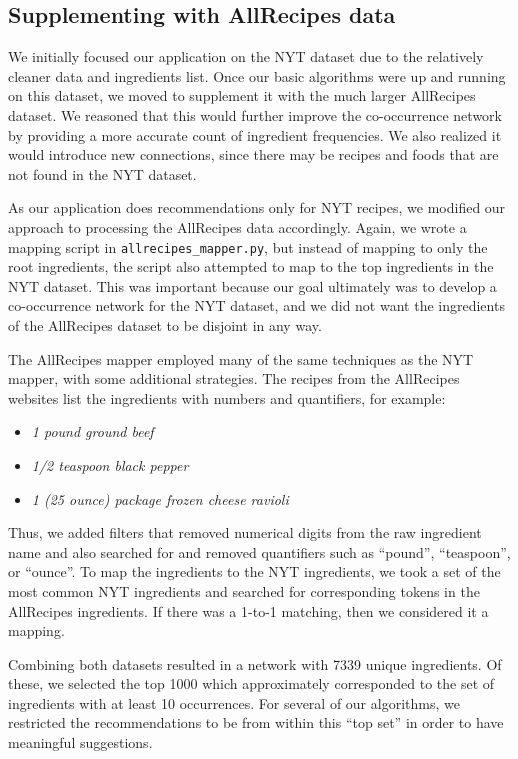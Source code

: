 \documentclass{acm_proc_article-sp}
\begin{document}
\subsection{Supplementing with AllRecipes data}
We initially focused our application on the NYT dataset due to the relatively cleaner data and ingredients list. Once our basic algorithms were up and running on this dataset, we moved to supplement it with the much larger AllRecipes dataset. We reasoned that this would further improve the co-occurrence network by providing a more accurate count of ingredient frequencies. We also realized it would introduce new connections, since there may be recipes and foods that are not found in the NYT dataset.

As our application does recommendations only for NYT recipes, we modified our approach to processing the AllRecipes data accordingly. Again, we wrote a mapping script in \texttt{allrecipes\_mapper.py}, but instead of mapping to only the root ingredients, the script also attempted to map to the top ingredients in the NYT dataset. This was important because our goal ultimately was to develop a co-occurrence network for the NYT dataset, and we did not want the ingredients of the AllRecipes dataset to be disjoint in any way. 

The AllRecipes mapper employed many of the same techniques as the NYT mapper, with some additional strategies. The recipes from the AllRecipes websites list the ingredients with numbers and quantifiers, for example:
\begin{itemize}
       \item {\em 1 pound ground beef}
       \item {\em 1/2 teaspoon black pepper}
       \item {\em 1 (25 ounce) package frozen cheese ravioli}
\end{itemize}
Thus, we added filters that removed numerical digits from the raw ingredient name and also searched for and removed quantifiers such as ``pound'', ``teaspoon'', or ``ounce''. To map the ingredients to the NYT ingredients, we took a set of the most common NYT ingredients and searched for corresponding tokens in the AllRecipes ingredients. If there was a 1-to-1 matching, then we considered it a mapping.

Combining both datasets resulted in a network with 7339 unique ingredients. Of these, we selected the top 1000 which approximately corresponded to the set of ingredients with at least 10 occurrences. For several of our algorithms, we restricted the recommendations to be from within this ``top set'' in order to have meaningful suggestions.
\end{document}
